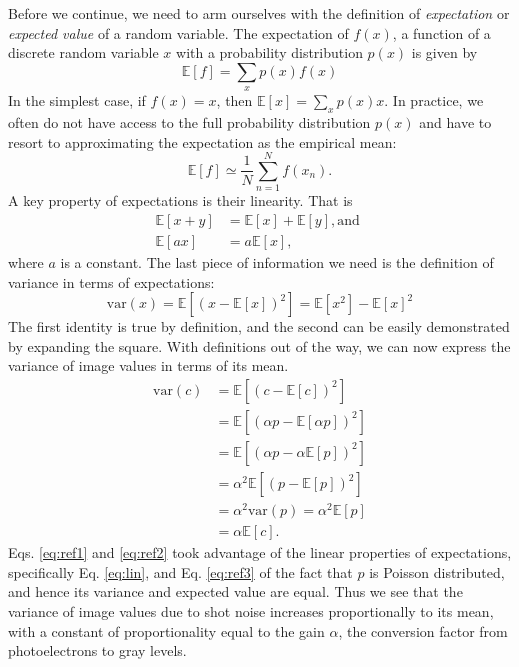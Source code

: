 \documentclass[a4paper]{report}
\begin{document}
Before we continue, we need to arm ourselves with the definition of \textit{expectation} or \textit{expected value} of a random variable. 
The expectation of $f(x)$, a function of a discrete random variable $x$ with a probability distribution $p(x)$ is given by
\begin{equation}
\mathbb {E} [f] = \sum _{x} p(x) f(x)
\end{equation}
In the simplest case, if $f(x) = x$, then $\mathbb {E} [x] = \sum _{x} p(x) x$. 
In practice, we often do not have access to the full probability distribution $p(x)$ and have to resort to approximating the expectation as the empirical mean:
\begin{equation}
\mathbb { E } [ f ] \simeq \frac { 1 } { N } \sum _ { n = 1 } ^ { N } f \left( x _ { n } \right).
\end{equation}
A key property of expectations is their linearity. That is
\begin{align}
\mathbb{E}[x+y] &= \mathbb{E}[x] + \mathbb{E}[y], \textrm{and } \\
\mathbb{E}[ax] & = a \mathbb{E}[x], \label{eq:lin}
\end{align}
where $a$ is a constant. The last piece of information we need is the definition of variance in terms of expectations:
\begin{equation}
	\mathrm{var}(x) = \mathbb{E}[(x - \mathbb{E}[x])^2] = \mathbb{E}[x^2] - \mathbb{E}[x]^2
\end{equation}
The first identity is true by definition, and the second can be easily demonstrated by expanding the square. With definitions out of the way, we can now express the variance of image values in terms of its mean.
\begin{align}
	\mathrm{var}(c) & = \mathbb{E}[(c - \mathbb{E}[c])^2] \\
	& = \mathbb{E}[(\alpha p - \mathbb{E}[\alpha p])^2] \\ 
	& = \mathbb{E}[(\alpha p - \alpha \mathbb{E}[p] )^2] \label{eq:ref1} \\ 
	& = \alpha^2 \mathbb{E}[(p - \mathbb{E}[p])^2] \label{eq:ref2} \\ 
	& = \alpha^2 \mathrm{var}(p) = \alpha^2 \mathbb{E}[p] \label{eq:ref3} \\
	& = \alpha\mathbb{E}[c].
\end{align}
Eqs. \ref{eq:ref1} and \ref{eq:ref2} took advantage of the linear properties of expectations, specifically Eq. \ref{eq:lin}, and Eq. \ref{eq:ref3} of the fact that $p$ is Poisson distributed, and hence its variance and expected value are equal. Thus we see that the variance of image values due to shot noise increases proportionally to its mean, with a constant of proportionality equal to the gain $\alpha$, the conversion factor from photoelectrons to gray levels.
\end{document}
